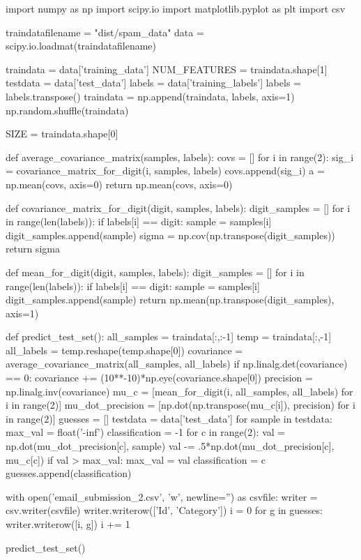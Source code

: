 \documentclass{article}
\begin{document}
\begin{python}
import numpy as np
import scipy.io
import matplotlib.pyplot as plt
import csv

traindatafilename = "dist/spam_data"
data = scipy.io.loadmat(traindatafilename)

traindata = data['training_data']
NUM_FEATURES = traindata.shape[1]
testdata = data['test_data']
labels = data['training_labels']
labels = labels.transpose()
traindata = np.append(traindata, labels, axis=1)
np.random.shuffle(traindata)

SIZE = traindata.shape[0]

def average_covariance_matrix(samples, labels):
    covs = []
    for i in range(2):
        sig_i = covariance_matrix_for_digit(i, samples, labels)
        covs.append(sig_i)
    a = np.mean(covs, axis=0)
    return np.mean(covs, axis=0)

def covariance_matrix_for_digit(digit, samples, labels):
    digit_samples = []
    for i in range(len(labels)):
        if labels[i] == digit:
            sample = samples[i]
            digit_samples.append(sample)
    sigma = np.cov(np.transpose(digit_samples))
    return sigma

def mean_for_digit(digit, samples, labels):
    digit_samples = []
    for i in range(len(labels)):
        if labels[i] == digit:
            sample = samples[i]
            digit_samples.append(sample)
    return np.mean(np.transpose(digit_samples), axis=1)

def predict_test_set():
    all_samples = traindata[:,:-1]
    temp = traindata[:,-1]
    all_labels = temp.reshape(temp.shape[0])
    covariance = average_covariance_matrix(all_samples, all_labels)
    if np.linalg.det(covariance) == 0:
        covariance += (10**-10)*np.eye(covariance.shape[0])
    precision = np.linalg.inv(covariance)
    mu_c = [mean_for_digit(i, all_samples, all_labels) for i in range(2)]
    mu_dot_precision = [np.dot(np.transpose(mu_c[i]), precision) for i in range(2)]
    guesses = []
    testdata = data['test_data']
    for sample in testdata:
        max_val = float('-inf')
        classification = -1
        for c in range(2):
            val = np.dot(mu_dot_precision[c], sample)
            val -= .5*np.dot(mu_dot_precision[c], mu_c[c])
            if val > max_val:
                max_val = val
                classification = c
        guesses.append(classification)

    with open('email_submission_2.csv', 'w', newline='') as csvfile:
        writer = csv.writer(csvfile)
        writer.writerow(['Id', 'Category'])
        i = 0
        for g in guesses:
            writer.writerow([i, g])
            i += 1

predict_test_set()
\end{python}
\end{document}
